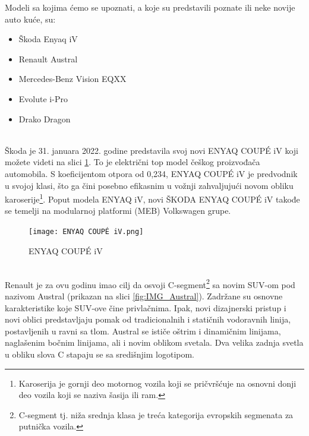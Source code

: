 \documentclass[a4paper]{article}
\begin{document}
    Modeli sa kojima ćemo se upoznati, a koje su predstavili poznate ili neke novije auto kuće, su:\\
    \begin{itemize}
     \item Škoda Enyaq iV 
     \item Renault Austral   
     \item Mercedes-Benz Vision EQXX 
     \item Evolute i-Pro 
     \item Drako Dragon\\ 
    \end{itemize}
    
\\

    Škoda je 31. januara 2022. godine predstavila svoj novi ENYAQ COUPÉ iV koji možete videti na slici \ref{fig:IMG_Enyaq}. To je električni top model češkog proizvođača automobila. S koeficijentom otpora od 0,234, ENYAQ COUPÉ iV je predvodnik u svojoj klasi, što ga čini posebno efikasnim u vožnji zahvaljujući novom obliku karoserije\footnote{Karoserija je gornji deo motornog vozila koji se pričvršćuje na osnovni donji deo vozila koji se naziva šasija ili ram.}. Poput modela ENYAQ iV, novi ŠKODA ENYAQ COUPÉ iV takođe se temelji na modularnoj platformi (MEB) Volkswagen grupe. \\ 

\begin{figure}[h]
        \centering
        \texttt{[image: ENYAQ COUPÉ iV.png]}
        \caption{ENYAQ COUPÉ iV}
        \label{fig:IMG_Enyaq}
\end{figure}

\newpage

\\

    Renault je za ovu godinu imao cilj da osvoji C-segment\footnote{C-segment tj. niža srednja klasa je treća kategorija evropskih segmenata za putnička vozila.} sa novim SUV-om pod nazivom Austral (prikazan na slici \ref{fig:IMG_Austral}). Zadržane su osnovne karakteristike koje SUV-ove čine privlačnima. Ipak, novi dizajnerski pristup i novi oblici predstavljaju pomak od tradicionalnih i statičnih vodoravnih linija, postavljenih u ravni sa tlom. Austral se ističe oštrim i dinamičnim linijama, naglašenim bočnim linijama, ali i novim oblikom svetala. Dva velika zadnja svetla u obliku slova C stapaju se sa središnjim logotipom.\\  
\end{document}
